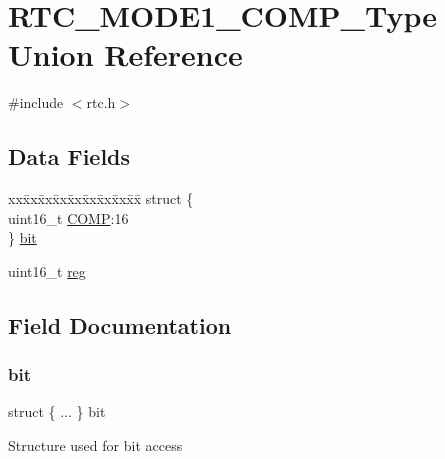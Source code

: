 \hypertarget{union_r_t_c___m_o_d_e1___c_o_m_p___type}{}\section{R\+T\+C\+\_\+\+M\+O\+D\+E1\+\_\+\+C\+O\+M\+P\+\_\+\+Type Union Reference}
\label{union_r_t_c___m_o_d_e1___c_o_m_p___type}


{\ttfamily \#include $<$rtc.\+h$>$}

\subsection*{Data Fields}
\begin{DoxyCompactItemize}
\item 
\begin{tabbing}
xx\=xx\=xx\=xx\=xx\=xx\=xx\=xx\=xx\=\kill
struct \{\\
\>uint16\_t \mbox{\hyperlink{union_r_t_c___m_o_d_e1___c_o_m_p___type_ae06469b8775ab3b7343cae88dcfa377c}{COMP}}:16\\
\} \mbox{\hyperlink{union_r_t_c___m_o_d_e1___c_o_m_p___type_afb38a7fae32d7fa52cc2d6dee76c71ee}{bit}}\\

\end{tabbing}\item 
uint16\+\_\+t \mbox{\hyperlink{union_r_t_c___m_o_d_e1___c_o_m_p___type_a11760f5020019f4aa8cb02e694f7cc44}{reg}}
\end{DoxyCompactItemize}


\subsection{Field Documentation}
\mbox{\label{union_r_t_c___m_o_d_e1___c_o_m_p___type_afb38a7fae32d7fa52cc2d6dee76c71ee}} 
\subsubsection{\texorpdfstring{bit}{bit}}
{\footnotesize\ttfamily struct \{ ... \}   bit}

Structure used for bit access \mbox{\label{union_r_t_c___m_o_d_e1___c_o_m_p___type_ae06469b8775ab3b7343cae88dcfa377c}} 
